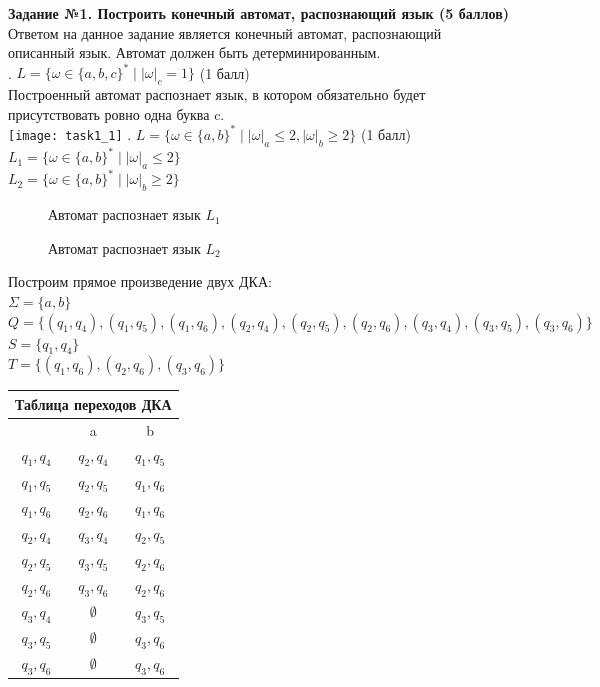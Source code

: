 \documentclass{article}
\begin{document}
\newpage
\textbf{\Large Задание №1. Построить конечный автомат, распознающий язык (5 баллов)}\\
\hfill \break
\normalsize{Ответом на данное задание является конечный автомат, распознающий описанный язык. Автомат должен быть детерминированным.}\\
\hfill {}. \(L = \{\omega  \in \{a,b,c\}^* \mid |\omega|_c = 1\}\) (1 балл)\\
\hfill \break
\normalsize{Построенный автомат распознает язык, в котором обязательно будет присутствовать ровно одна буква c.}\\
\texttt{[image: task1\_1]}
\hfill {}. \(L = \{\omega  \in \{a,b\}^* \mid |\omega|_a \leq 2, |\omega|_b \geq 2\}\) (1 балл)\\
\(L_1 = \{\omega  \in \{a,b\}^* \mid |\omega|_a \leq 2\}\)\\
\(L_2 = \{\omega  \in \{a,b\}^* \mid |\omega|_b \geq 2\}\)
\begin{figure} [h]
\caption{Автомат распознает язык \(L_1\)}
\end{figure}
\begin{figure}[h]
\caption{Автомат распознает язык \(L_2\)}
\end{figure}
\hfill \break
\normalsize{Построим прямое произведение двух ДКА:}\\
\(\Sigma = \{a,b\}\)\\
\(Q = \{(q_1,q_4), (q_1,q_5),(q_1,q_6),(q_2,q_4),(q_2,q_5),(q_2,q_6),(q_3,q_4),(q_3,q_5),(q_3,q_6)\}\)\\
\(S = \{q_1,q_4\}\)\\
\(T = \{(q_1,q_6),(q_2,q_6),(q_3,q_6)\}\)
\begin{center}
\begin{tabular} {|c |c |c|}
\hline
\multicolumn{3}{|c|}{Таблица переходов ДКА} \\
\hline
 & a & b \\
\hline
\(q_1,q_4\) & \(q_2,q_4\) & \(q_1,q_5\) \\
\hline
\(q_1,q_5\) & \(q_2,q_5\) & \(q_1,q_6\) \\
\hline
\(q_1,q_6\) & \(q_2,q_6\) & \(q_1,q_6\) \\
\hline
\(q_2,q_4\) & \(q_3,q_4\) & \(q_2,q_5\) \\
\hline
\(q_2,q_5\) & \(q_3,q_5\) & \(q_2,q_6\) \\
\hline
\(q_2,q_6\) & \(q_3,q_6\) & \(q_2,q_6\) \\
\hline
\(q_3,q_4\) & \(\emptyset\) & \(q_3,q_5\) \\
\hline
\(q_3,q_5\) & \(\emptyset\) & \(q_3,q_6\) \\
\hline
\(q_3,q_6\) & \(\emptyset\) & \(q_3,q_6\) \\
\hline
\end{tabular}
\end{center}
\end{document}
